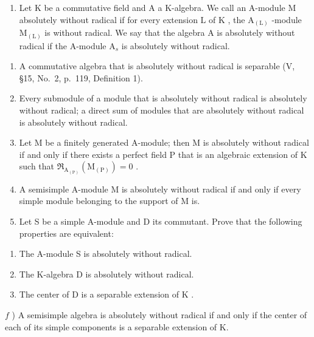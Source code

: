 
\begin{enumerate}
\def\labelenumi{\arabic{enumi})}
\tightlist
\item
  Let \(\mathrm{K}\) be a commutative field and \(\mathrm{A}\) a K-algebra. We call an A-module M absolutely without radical if for every extension \(\mathrm{L}\) of \(\mathrm{K}\) , the \(\mathrm{A}_{(\mathrm{L})}\) -module \(\mathrm{M}_{(\mathrm{L})}\) is without radical. We say that the algebra \(\mathrm{A}\) is absolutely without radical if the A-module \(\mathrm{A}_s\) is absolutely without radical.
\end{enumerate}

\begin{enumerate}
\def\labelenumi{\alph{enumi})}
\item
  A commutative algebra that is absolutely without radical is separable (V, §15, No.~2, p.~119, Definition 1).
\item
  Every submodule of a module that is absolutely without radical is absolutely without radical; a direct sum of modules that are absolutely without radical is absolutely without radical.
\item
  Let M be a finitely generated A-module; then M is absolutely without radical if and only if there exists a perfect field P that is an algebraic extension of K such that \(\mathfrak{R}_{\mathrm{A}_{(\mathrm{P})}}(\mathrm{M}_{(\mathrm{P})}) = 0\) .
\item
  A semisimple A-module M is absolutely without radical if and only if every simple module belonging to the support of M is.
\item
  Let S be a simple A-module and D its commutant. Prove that the following properties are equivalent:
\end{enumerate}

\begin{enumerate}
\def\labelenumi{(\roman{enumi})}
\item
  The A-module S is absolutely without radical.
\item
  The K-algebra \(\mathrm{D}\) is absolutely without radical.
\item
  The center of \(\mathrm{D}\) is a separable extension of \(\mathrm{K}\) .
\end{enumerate}

\(f\) ) A semisimple algebra is absolutely without radical if and only if the center of each of its simple components is a separable extension of K.

